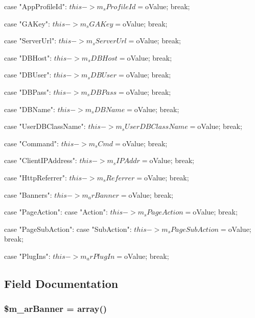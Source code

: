 \begin{DoxyCode}
{{            case "AppProfileId":
                $this->m_sProfileId = $oValue;
                break;

            case "GAKey":
                $this->m_sGAKey = $oValue;
                break;

            case "ServerUrl":
                $this->m_sServerUrl = $oValue;
                break;

            case "DBHost":
                $this->m_sDBHost = $oValue;
                break;

            case "DBUser":
                $this->m_sDBUser = $oValue;
                break;

            case "DBPass":
                $this->m_sDBPass = $oValue;
                break;

            case "DBName":
                $this->m_sDBName = $oValue;
                break;

            case "UserDBClassName":
                $this->m_sUserDBClassName = $oValue;
                break;

            case "Command":
                $this->m_sCmd = $oValue;
                break;

            case "ClientIPAddress":
                $this->m_sIPAddr = $oValue;
                break;

            case "HttpReferrer":
                $this->m_sReferrer = $oValue;
                break;

            case "Banners":
                $this->m_arBanner = $oValue;
                break;

            case "PageAction":
            case "Action":
                $this->m_sPageAction = $oValue;
                break;

            case "PageSubAction":
            case "SubAction":
                $this->m_sPageSubAction = $oValue;
                break;

            case "PlugIns":
                $this->m_arPlugIn = $oValue;
                break;
        }
    }
\end{DoxyCode}




\subsection{Field Documentation}
\hypertarget{classSF__AppConfig_a03606a66e78d358c6094f05f0857845d}{
\subsubsection[{\$m\_\-arBanner}]{\setlength{\rightskip}{0pt plus 5cm}\$m\_\-arBanner = {\bf array}()}}
\label{classSF__AppConfig_a03606a66e78d358c6094f05f0857845d}


